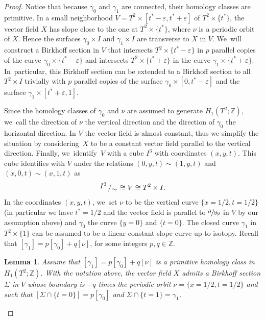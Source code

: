 \documentclass[10pt]{amsart}
\newcommand{\spp}[2]{\sfrac{\partial#1}{\partial#2}}
\newtheorem{lemma}[theorem]{Lemma}
\theoremstyle{definition}
\newcommand{\bigslant}[2]{{\raisebox{.2em}{$#1$}\left/\raisebox{-.2em}{$#2$}\right.}}
\begin{document}
\begin{proof}
{Notice that because $\gamma_0$ and $\gamma_1$ are connected, their homology classes are primitive.} In a small neighborhood $V=T^2\times [t^*-\varepsilon,t^*+\varepsilon]$ of $T^2 \times \{t^*\}$, the vector field $X$ has slope close to the one at $T^2\times \{t^*
\}$, where $\nu$ is a periodic orbit of $X$. Hence the surfaces $\gamma_0\times I$ and $\gamma_1 \times I$ are transverse to $X$ in $V$. We~will construct a Birkhoff section in $V$ that intersects $T^2\times\{t^*-\varepsilon\}$ in $p$ parallel copies of the curve $\gamma_0 \times \{t^*-\varepsilon\}$ and intersects $T^2\times\{t^*+\varepsilon\}$ in the curve $\gamma_1\times \{t^*+\varepsilon\}$. In~particular, this Birkhoff section can be extended to a Birkhoff section to all $T^2\times I$ trivially with $p$ parallel copies of the surface $\gamma_0\times [0,t^*-\varepsilon]$ and the surface $\gamma_1 \times [t^*+\varepsilon,1]$.

{Since the homology classes of $\gamma_0$ and $\nu$ are assumed to generate $H_1(T^2;\mathbb{Z})$, we~call the direction of $\nu$ the vertical direction and the direction of $\gamma_0$ the horizontal direction.} In $V$ the vector field is almost constant, thus we simplify the situation by considering~$X$ to be a constant vector field parallel to the vertical direction. Finally, we~iden\-ti\-fy~$V$ with a cube $I^3$ with coordinates $(x,y,t)$. This cube identifies with $V$ under the relations $(0,y,t) \sim (1,y,t)$ and $(x,0,t) \sim (x,1,t)$ as
\[
\bigslant{I^3}{\sim} \cong V\cong T^2\times I.
\]
{In the coordinates $(x,y,t)$, we~set $\nu$ to be the vertical} curve $\{x=1/2,t=1/2\}$ (in particular we have $t^*=1/2$ and the vector field is parallel to $\spp{}{y}$ in $V$ by our assumption above) and $\gamma_0$ the curve $\{y=0\}$ and $\{t=0\}$.
The closed curve $\gamma_1$ in $T^2\times \{1\}$ can be assumed to be a linear constant slope curve up to isotopy. Recall that
$[\gamma_1]=p[\gamma_0]+ q[\nu]$,
for some integers $p,q\in \mathbb{Z}$.

\begin{lemma}\label{lem:Birk}
Assume that $[\gamma_1]=p [\gamma_0] + q [\nu]$ is a primitive homology class in $H_1(T^2;\mathbb{Z})$. With the notation above, the vector field $X$ admits a Birkhoff section $\Sigma$ in $V$ whose boundary is $-q$ times the periodic orbit $\nu=\{x=1/2, t=1/2\}$ and such that $[\Sigma\cap \{t=0\}] =p [\gamma_0]$ and $\Sigma \cap \{t=1\}=\gamma_1$.
\end{lemma}


\end{proof}
\end{document}
